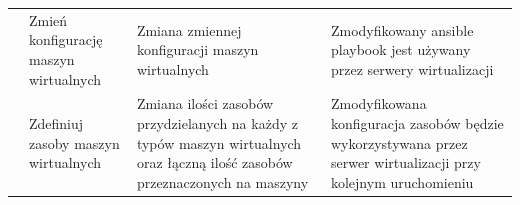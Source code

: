 \documentclass[12pt]{article}
\begin{document}
\begin{center}
\begin{table}[h!]
\begin{tabular}{|p{}|p{}|p{}|p{}|}
			                                                & Zmień konfigurację maszyn wirtualnych & Zmiana zmiennej konfiguracji maszyn wirtualnych                                                                              & Zmodyfikowany ansible playbook jest używany przez serwery wirtualizacji                                                          \\ \cline{2-4}
			                                                & Zdefiniuj zasoby maszyn wirtualnych   & Zmiana ilości zasobów przydzielanych na każdy z typów maszyn wirtualnych oraz łączną ilość zasobów przeznaczonych na maszyny & Zmodyfikowana konfiguracja zasobów będzie wykorzystywana przez serwer wirtualizacji przy kolejnym uruchomieniu                   \\
			\hline
		\end{tabular}
	\end{table}
\end{center}

\newpage
\end{document}
